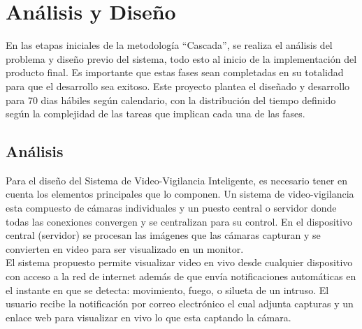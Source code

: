 \chapter{Análisis y Diseño}

En las etapas iniciales de la metodología ``Cascada'', se realiza el análisis del problema y diseño previo del sistema, todo esto al inicio de la implementación del producto final. Es importante que estas fases sean completadas en su totalidad para que el desarrollo sea exitoso. Este proyecto plantea el diseñado y desarrollo para 70 dias hábiles según calendario, con la distribución del tiempo definido según la complejidad de las tareas que implican cada una de las fases.\\

\section{Análisis}
Para el diseño del Sistema de Video-Vigilancia Inteligente, es necesario tener en cuenta los elementos principales que lo componen. Un sistema de video-vigilancia esta compuesto de cámaras individuales y un puesto central o servidor donde todas las conexiones convergen y se centralizan para su control. En el dispositivo central (servidor) se procesan las imágenes que las cámaras capturan y se convierten en video para ser visualizado en un monitor.\\

El sistema propuesto permite visualizar video en vivo desde cualquier dispositivo con acceso a la red de internet además de que envía notificaciones automáticas en el instante en que se detecta: movimiento, fuego, o silueta de un intruso. El usuario recibe la notificación por correo electrónico el cual adjunta capturas y un enlace web para visualizar en vivo lo que esta captando la cámara.\\


